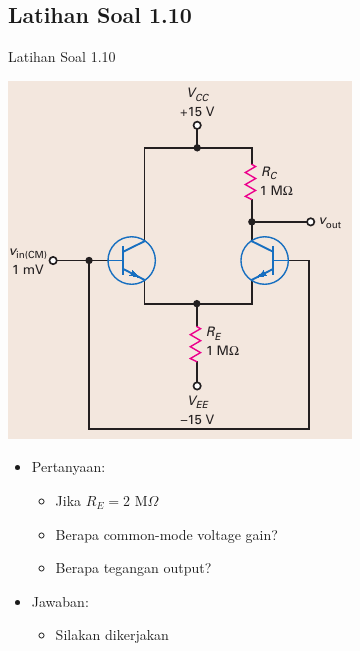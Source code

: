 \documentclass[aspectratio=169]{beamer}
\begin{document}
\subsection{Latihan Soal 1.10}
\begin{frame}{Latihan Soal 1.10}
	\begin{multicols}{2}
		\begin{center}
			\includegraphics[height=0.7\textheight]{gambar/01.fig21}
		\end{center}
		\columnbreak
		\begin{itemize}
			\item Pertanyaan:
			\begin{itemize}
				\item Jika $ R_E = 2 \text{ M}\Omega $
				\item Berapa common-mode voltage gain?
				\item Berapa tegangan output?
			\end{itemize}
			\item Jawaban:
			\begin{itemize}
				\item Silakan dikerjakan
			\end{itemize}
		\end{itemize}
	\end{multicols}
\end{frame}
\end{document}
